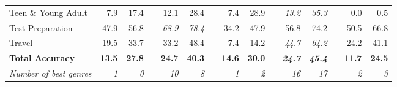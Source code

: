 \documentclass[12pt]{article}
\numberwithin{equation}{section}
\numberwithin{figure}{section}
\begin{document}
\begin{table}[]
{\begin{tabular}{lrrrrrrrrrrrrrr}
	Teen \& Young Adult            & 7.9                                & 17.4                               &                               & 12.1                               & 28.4                               &                               & 7.4                                & 28.9                               &                               & \textit{13.2}                      & \textit{35.3}                      &                               & 0.0                                & 0.5                                \\
	Test Preparation               & 47.9                               & 56.8                               &                               & \textit{68.9}                      & \textit{78.4}                      &                               & 34.2                               & 47.9                               &                               & 56.8                               & 74.2                               &                               & 50.5                               & 66.8                               \\
	Travel                         & 19.5                               & 33.7                               &                               & 33.2                               & 48.4                               &                               & 7.4                                & 14.2                               &                               & \textit{44.7}                      & \textit{64.2}                      &                               & 24.2                               & 41.1                               \\ \hline
	\textbf{Total Accuracy}         & \textbf{13.5}                      & \textbf{27.8}                      & \textbf{}                     & \textbf{24.7}                      & \textbf{40.3}                      & \textbf{}                     & \textbf{14.6}                      & \textbf{30.0}                      &                               & \textit{\textbf{24.7}}             & \textit{\textbf{45.4}}             &                               & \textbf{11.7}                      & \textbf{24.5}                      \\ \hline
	\textit{Number of best genres} & \textit{1}                         & \textit{0}                         & \textit{}                     & \textit{10}                        & \textit{8}                         & \textit{}                     & \textit{1}                         & \textit{2}                         & \textit{}                     & \textit{16}                        & \textit{17}                        & \textit{}                     & \textit{2}                         & \textit{3}                        

\end{tabular}}
\end{table}
\end{document}
